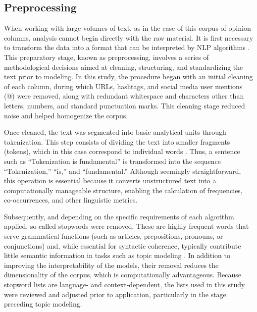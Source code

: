 \documentclass[pdflatex,sn-mathphys-num,iicol]{sn-jnl}
\begin{document}
	
	\subsection{Preprocessing}\label{subsec:preprocessing}
	
	When working with large volumes of text, as in the case of this corpus of opinion columns, analysis cannot begin directly with the raw material. It is first necessary to transform the data into a format that can be interpreted by NLP algorithms \cite{Chai2022}. This preparatory stage, known as preprocessing, involves a series of methodological decisions aimed at cleaning, structuring, and standardizing the text prior to modeling. In this study, the procedure began with an initial cleaning of each column, during which URLs, hashtags, and social media user mentions (@) were removed, along with redundant whitespace and characters other than letters, numbers, and standard punctuation marks. This cleaning stage reduced noise and helped homogenize the corpus.
	
	Once cleaned, the text was segmented into basic analytical units through tokenization. This step consists of dividing the text into smaller fragments (tokens), which in this case correspond to individual words \cite{Tyagi_text}. Thus, a sentence such as ``Tokenization is fundamental'' is transformed into the sequence ``Tokenization,'' ``is,'' and ``fundamental.'' Although seemingly straightforward, this operation is essential because it converts unstructured text into a computationally manageable structure, enabling the calculation of frequencies, co-occurrences, and other linguistic metrics.
	
	Subsequently, and depending on the specific requirements of each algorithm applied, so-called stopwords were removed. These are highly frequent words that serve grammatical functions (such as articles, prepositions, pronouns, or conjunctions) and, while essential for syntactic coherence, typically contribute little semantic information in tasks such as topic modeling \cite{Siino2024}. In addition to improving the interpretability of the models, their removal reduces the dimensionality of the corpus, which is computationally advantageous. Because stopword lists are language- and context-dependent, the lists used in this study were reviewed and adjusted prior to application, particularly in the stage preceding topic modeling.
	
\end{document}
